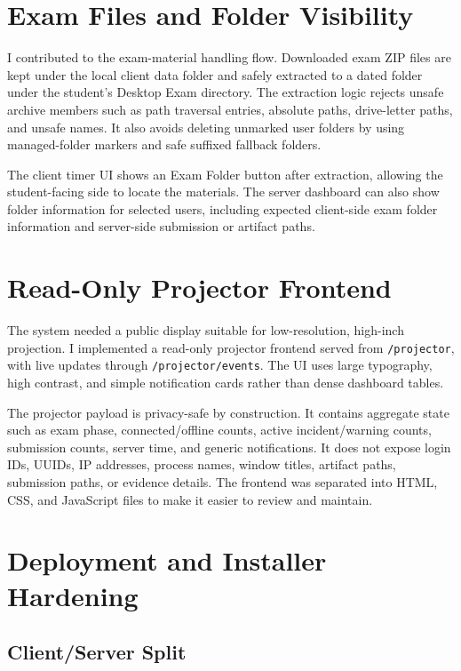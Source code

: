 \documentclass[conference]{IEEEtran}
\begin{document}
\section{Exam Files and Folder Visibility}

I contributed to the exam-material handling flow. Downloaded exam ZIP files are kept under the local client data folder and safely extracted to a dated folder under the student's Desktop Exam directory. The extraction logic rejects unsafe archive members such as path traversal entries, absolute paths, drive-letter paths, and unsafe names. It also avoids deleting unmarked user folders by using managed-folder markers and safe suffixed fallback folders.

The client timer UI shows an Exam Folder button after extraction, allowing the student-facing side to locate the materials. The server dashboard can also show folder information for selected users, including expected client-side exam folder information and server-side submission or artifact paths.

\section{Read-Only Projector Frontend}

The system needed a public display suitable for low-resolution, high-inch projection. I implemented a read-only projector frontend served from \texttt{/projector}, with live updates through \texttt{/projector/events}. The UI uses large typography, high contrast, and simple notification cards rather than dense dashboard tables.

The projector payload is privacy-safe by construction. It contains aggregate state such as exam phase, connected/offline counts, active incident/warning counts, submission counts, server time, and generic notifications. It does not expose login IDs, UUIDs, IP addresses, process names, window titles, artifact paths, submission paths, or evidence details. The frontend was separated into HTML, CSS, and JavaScript files to make it easier to review and maintain.

\section{Deployment and Installer Hardening}

\subsection{Client/Server Split}
\end{document}
